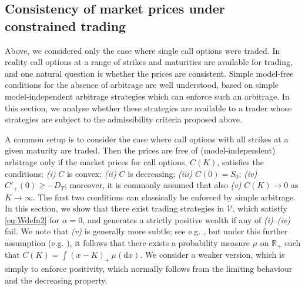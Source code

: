 \documentclass[a4paper]{amsart}
\newtheorem{conjecture}[theorem]{Conjecture}
\theoremstyle{definition}
\theoremstyle{remark}
\numberwithin{equation}{section}
\newcommand{\R}{\mathbb{R}}
\newcommand{\eg}{e.g.}
\newcommand{\dx}{\mathrm{d}x}
\newcommand{\Vc}{\mathcal{V}}
\begin{document}



  



\subsection{Consistency of market prices under constrained trading}

Above, we considered only the case where single call options were traded. In reality call options at a range of strikes and maturities are available for trading, and one natural question is whether the prices are consistent. Simple model-free conditions for the absence of arbitrage are well understood, based on simple model-independent arbitrage strategies which can enforce such an arbitrage. In this section, we analyse whether these strategies are available to a trader whose strategies are subject to the admissibility criteria proposed above.

A common setup is to consider the case where call options with all strikes at a given maturity are traded. Then the prices are free of (model-independent) arbitrage only if the market prices for call options, $C(K)$, satisfies the conditions: \emph{(i)} $C$ is convex; \emph{(ii)} $C$ is decreasing; \emph{(iii)} $C(0) = S_0$; \emph{(iv)} $C'_+(0) \ge -D_T$; moreover, it is commonly assumed that also \emph{(v)} $C(K) \to 0$ as $K \to \infty$. The first two conditions can classically be enforced by simple arbitrage. In this section, we show that there exist trading strategies in $\Vc$, which satistfy \eqref{eq:Wdefn2} for $\alpha = 0$, and generates a strictly positive wealth if any of \emph{(i)}--\emph{(iv)} fail. We note that \emph{(v)} is generally more subtle; see \eg{} \cite{Cox:2016aa}, but under this further assumption (\eg{} \cite{Cox:2011aa}), it follows that there exists a probability measure $\mu$ on $\R_+$ such that $C(K) = \int (x-K)_+ \, \mu(\dx)$. We consider a weaker version, which is simply to enforce positivity, which normally follows from the limiting behaviour and the decreasing property.
\end{document}
